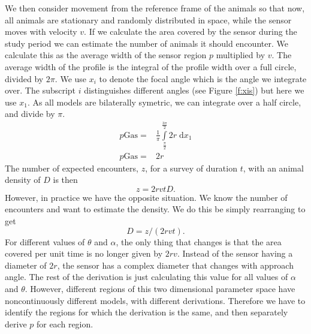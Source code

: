 We then consider movement from the reference frame of the animals so that now, all animals are stationary and randomly distributed in space, while the sensor moves with velocity $v$. If we calculate the area covered by the sensor during the study period we can estimate the number of animals it should encounter. We calculate this as the average width of the sensor region $p$ multiplied by $v$. The average width of the profile is the integral of the profile width over a full circle, divided by $2\pi$. We use $x_i$ to denote the focal angle which is the angle we integrate over. The subscript $i$ distinguishes different angles (see Figure \ref{f:xis}) but here we use $x_1$.  As all models are bilaterally symetric, we can integrate over a half circle, and divide by $\pi$.
\begin{align}
p\text{Gas} =& \frac{1}{\pi}\int\limits_{\frac{\pi}{2}}^{\frac{3\pi}{2}} 2r \; \mathrm{d}x_1\\
p\text{Gas} =& 2r
\end{align}
The number of expected encounters, $z$, for a survey of duration $t$, with an animal density of $D$ is then
\begin{equation}
	z = 2rvtD.
\end{equation}
However, in practice we have the opposite situation. We know the number of encounters and want to estimate the density. We do this be simply rearranging to get
\begin{equation}
	D = z/(2rvt).
\end{equation}
For different values of $\theta$ and $\alpha$, the only thing that changes is that the area covered per unit time is no longer given by $2rv$. Instead of the sensor having a diameter of $2r$, the sensor has a complex diameter that changes with approach angle. The rest of the derivation is just calculating this value for all values of $\alpha$ and $\theta$. However, different regions of this two dimensional parameter space have noncontinuously different models, with different derivations. Therefore we have to identify the regions for which the derivation is the same, and then separately derive $p$ for each region.



